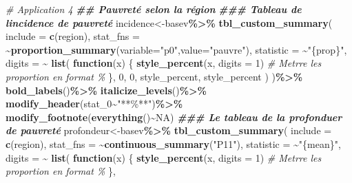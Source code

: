 \documentclass[
]{article}
\newenvironment{Shaded}{\begin{snugshade}}{\end{snugshade}}
\newcommand{\AttributeTok}[1]{\textcolor[rgb]{0.13,0.29,0.53}{#1}}
\newcommand{\CommentTok}[1]{\textcolor[rgb]{0.56,0.35,0.01}{\textit{#1}}}
\newcommand{\ConstantTok}[1]{\textcolor[rgb]{0.56,0.35,0.01}{#1}}
\newcommand{\ControlFlowTok}[1]{\textcolor[rgb]{0.13,0.29,0.53}{\textbf{#1}}}
\newcommand{\DecValTok}[1]{\textcolor[rgb]{0.00,0.00,0.81}{#1}}
\newcommand{\DocumentationTok}[1]{\textcolor[rgb]{0.56,0.35,0.01}{\textbf{\textit{#1}}}}
\newcommand{\FunctionTok}[1]{\textcolor[rgb]{0.13,0.29,0.53}{\textbf{#1}}}
\newcommand{\NormalTok}[1]{#1}
\newcommand{\OtherTok}[1]{\textcolor[rgb]{0.56,0.35,0.01}{#1}}
\newcommand{\SpecialCharTok}[1]{\textcolor[rgb]{0.81,0.36,0.00}{\textbf{#1}}}
\newcommand{\StringTok}[1]{\textcolor[rgb]{0.31,0.60,0.02}{#1}}
\begin{document}
\begin{Shaded}
\begin{Highlighting}[]
\CommentTok{\# Application 4}
\DocumentationTok{\#\# Pauvreté selon la région}
\DocumentationTok{\#\#\# Tableau de l\textquotesingle{}incidence de pauvreté}
\NormalTok{incidence}\OtherTok{\textless{}{-}}\NormalTok{basev}\SpecialCharTok{\%\textgreater{}\%}
  \FunctionTok{tbl\_custom\_summary}\NormalTok{(}
  \AttributeTok{include =} \FunctionTok{c}\NormalTok{(region),}
  \AttributeTok{stat\_fns =} \SpecialCharTok{\textasciitilde{}}\FunctionTok{proportion\_summary}\NormalTok{(}\AttributeTok{variable=}\StringTok{"p0"}\NormalTok{,}\AttributeTok{value=}\StringTok{"pauvre"}\NormalTok{),}
  \AttributeTok{statistic =} \SpecialCharTok{\textasciitilde{}}\StringTok{"\{prop\}"}\NormalTok{,}
  \AttributeTok{digits =} \SpecialCharTok{\textasciitilde{}} \FunctionTok{list}\NormalTok{(}
      \ControlFlowTok{function}\NormalTok{(x) \{}
        \FunctionTok{style\_percent}\NormalTok{(x, }\AttributeTok{digits =} \DecValTok{1}\NormalTok{) }
        \CommentTok{\# Metrre les proportion en format \%}
\NormalTok{      \},}
      \DecValTok{0}\NormalTok{, }\DecValTok{0}\NormalTok{, style\_percent, style\_percent}
\NormalTok{    )}
\NormalTok{)}\SpecialCharTok{\%\textgreater{}\%}
  \FunctionTok{bold\_labels}\NormalTok{()}\SpecialCharTok{\%\textgreater{}\%} 
  \FunctionTok{italicize\_levels}\NormalTok{()}\SpecialCharTok{\%\textgreater{}\%} 
  \FunctionTok{modify\_header}\NormalTok{(stat\_0}\SpecialCharTok{\textasciitilde{}}\StringTok{"**\%**"}\NormalTok{)}\SpecialCharTok{\%\textgreater{}\%}
  \FunctionTok{modify\_footnote}\NormalTok{(}\FunctionTok{everything}\NormalTok{()}\SpecialCharTok{\textasciitilde{}}\ConstantTok{NA}\NormalTok{)}
\DocumentationTok{\#\#\# Le tableau de la profonduer de pauvreté}
\NormalTok{profondeur}\OtherTok{\textless{}{-}}\NormalTok{basev}\SpecialCharTok{\%\textgreater{}\%}
  \FunctionTok{tbl\_custom\_summary}\NormalTok{(}
  \AttributeTok{include =} \FunctionTok{c}\NormalTok{(region),}
  \AttributeTok{stat\_fns =} \SpecialCharTok{\textasciitilde{}}\FunctionTok{continuous\_summary}\NormalTok{(}\StringTok{"P11"}\NormalTok{),}
  \AttributeTok{statistic =} \SpecialCharTok{\textasciitilde{}}\StringTok{"\{mean\}"}\NormalTok{,}
  \AttributeTok{digits =} \SpecialCharTok{\textasciitilde{}} \FunctionTok{list}\NormalTok{(}
      \ControlFlowTok{function}\NormalTok{(x) \{}
        \FunctionTok{style\_percent}\NormalTok{(x, }\AttributeTok{digits =} \DecValTok{1}\NormalTok{)  }
        \CommentTok{\# Metrre les proportion en format \%}
\NormalTok{      \},}

\end{Highlighting}
\end{Shaded}
\end{document}
